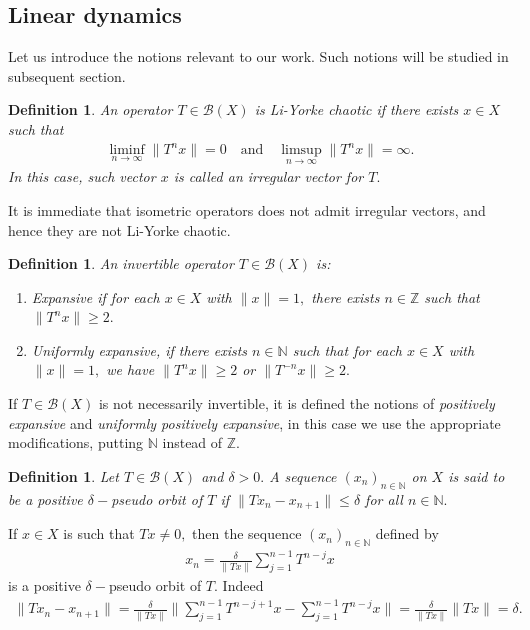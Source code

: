 \documentclass[11pt]{amsart}%
\numberwithin{equation}{section}
\theoremstyle{plain}
\newtheorem{dfn}[thm]{Definition}
\theoremstyle{definition}
\theoremstyle{definition}
\begin{document}
\subsection{Linear dynamics} Let us introduce the notions relevant to our work. Such notions will be studied in subsequent section. 

  
\begin{dfn}
An operator $T\in \mathcal{B}(X)$ is \textit{Li-Yorke chaotic} if  there exists $x\in X$ such that
\begin{align*}
\displaystyle\liminf_{n\to \infty}\|T^{n}x\|=0 \quad \text{and} 
\quad \displaystyle\limsup_{n\to \infty}\|T^{n}x\|=\infty.
\end{align*}
In this case, such vector $x$ is called an \textit{irregular vector} for $T.$ 
\end{dfn}
It is immediate that isometric operators does not admit irregular vectors, and hence they are not Li-Yorke chaotic.


\begin{dfn} An invertible operator $T\in \mathcal{B}(X)$ is:
\begin{enumerate}[label=\textnormal{(\roman*)}]
\item \textit{Expansive} if for each $x\in X$ with $\|x\|=1,$ there exists $n\in \mathbb{Z}$ such that $\|T^nx\|\geq 2.$
\item \textit{Uniformly expansive}, if there exists $n\in \mathbb{N}$ such that for each $x\in X$ with $\|x\|=1,$ we have $\|T^nx\|\geq 2$ or  $\|T^{-n}x\|\geq 2.$
\end{enumerate}
\end{dfn}

If $T\in \mathcal{B}(X)$ is not necessarily invertible, it is defined the notions of \textit{positively expansive} and \textit{uniformly positively expansive}, in this case we use the appropriate modifications, putting $\mathbb{N}$ instead of $\mathbb{Z}.$


\begin{dfn} Let $T\in \mathcal{B}(X)$ and $\delta>0.$ A sequence $(x_n)_{n\in \mathbb{N}}$ on $X$ is said to be a positive $\delta-$pseudo orbit of $T$ if $\|T x_{n} - x_{n+1}\| \leq \delta$ for all $n\in \mathbb{N}.$
\end{dfn}
If $x\in X$ is such that $Tx\neq 0,$ then the sequence $(x_{n})_{n\in \mathbb{N}}$ defined by
\begin{align}\label{pseudo}
x_n=\frac{\delta}{\|Tx\|}\sum_{j=1}^{n-1}T^{n-j}x
\end{align}
is a positive $\delta-$pseudo orbit of $T.$ Indeed
\begin{align*}
\|Tx_n-x_{n+1}\|=\frac{\delta}{\|Tx\|}\|\sum_{j=1}^{n-1}T^{n-j+1}x-\sum_{j=1}^{n-1}T^{n-j}x\|=\frac{\delta}{\|Tx\|}\|Tx\|=\delta.
\end{align*}
\end{document}
